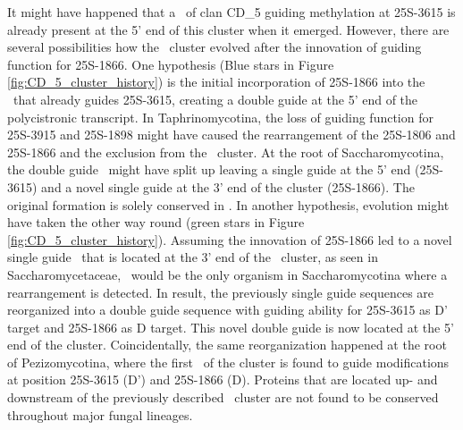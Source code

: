 It might have happened that a \sno\ of clan CD\_5 guiding
methylation at 25S-3615 is already present at the 5' end of this
cluster when it emerged. However, there are several possibilities how
the \sno\ cluster evolved after the innovation of guiding function for 25S-1866. 
One hypothesis (Blue stars in Figure \ref{fig:CD_5_cluster_history}) is the initial incorporation of 25S-1866 into the \sno\
that already guides 25S-3615, creating a double guide \sno at the 5'
end of the polycistronic transcript. In Taphrinomycotina, the loss of
guiding function for 25S-3915 and 25S-1898  might have caused the
rearrangement of the 25S-1806 and 25S-1866 and the exclusion from the
\sno\ cluster. At the root of Saccharomycotina, the double guide \sno\
might have split up leaving a single guide at the 5' end (25S-3615)
and a novel single guide at the 3' end of the cluster
(25S-1866). The original formation is solely conserved in
\Yli. In another hypothesis, evolution might have taken the other
way round (green stars in Figure
\ref{fig:CD_5_cluster_history}). Assuming the innovation of 25S-1866
led to a novel single guide \sno\ that is located at the 3' end of the
\sno\ cluster, as seen in Saccharomycetaceae, \yli\ would be the only
organism in Saccharomycotina where a  rearrangement is detected. In
result, the previously single guide sequences are reorganized into a
double guide sequence  with guiding ability for
25S-3615 as D' target and 25S-1866 as D target. This novel double guide is now located at the 5' end of the
cluster. 
Coincidentally, the same reorganization happened at the root
of Pezizomycotina, where the first \sno\ of the cluster is found to
guide modifications at position 25S-3615 (D') and 25S-1866
(D). Proteins that are located up- and downstream of the previously
described \sno\ cluster are not found to be conserved throughout major
fungal lineages.


